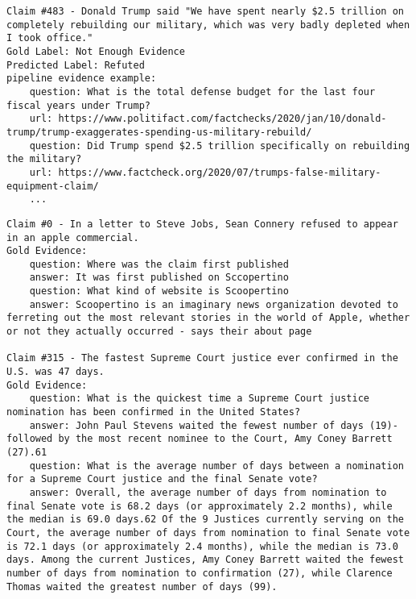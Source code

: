 \begin{lstlisting}[caption={An example of a claim where the evidence consists mainly of evidence from PolitiFact and Factcheck.org fact-checking articles leading to different predicted label than in the gold dataset}, label={lst:polifact_leakage}, breaklines=true, breakatwhitespace=false, columns=fullflexible]
Claim #483 - Donald Trump said "We have spent nearly $2.5 trillion on completely rebuilding our military, which was very badly depleted when I took office."
Gold Label: Not Enough Evidence
Predicted Label: Refuted
pipeline evidence example: 
    question: What is the total defense budget for the last four fiscal years under Trump?
    url: https://www.politifact.com/factchecks/2020/jan/10/donald-trump/trump-exaggerates-spending-us-military-rebuild/
    question: Did Trump spend $2.5 trillion specifically on rebuilding the military?
    url: https://www.factcheck.org/2020/07/trumps-false-military-equipment-claim/
    ...
\end{lstlisting}
\pagebreak
\begin{lstlisting}[caption={An example of a claims which differs in length.}, label={lst:different_lengths}, breaklines=true, breakatwhitespace=false, columns=fullflexible]
Claim #0 - In a letter to Steve Jobs, Sean Connery refused to appear in an apple commercial.
Gold Evidence:
    question: Where was the claim first published
    answer: It was first published on Sccopertino
    question: What kind of website is Scoopertino
    answer: Scoopertino is an imaginary news organization devoted to ferreting out the most relevant stories in the world of Apple, whether or not they actually occurred - says their about page

Claim #315 - The fastest Supreme Court justice ever confirmed in the U.S. was 47 days.
Gold Evidence:
    question: What is the quickest time a Supreme Court justice nomination has been confirmed in the United States?
    answer: John Paul Stevens waited the fewest number of days (19)-followed by the most recent nominee to the Court, Amy Coney Barrett (27).61
    question: What is the average number of days between a nomination for a Supreme Court justice and the final Senate vote?
    answer: Overall, the average number of days from nomination to final Senate vote is 68.2 days (or approximately 2.2 months), while the median is 69.0 days.62 Of the 9 Justices currently serving on the Court, the average number of days from nomination to final Senate vote is 72.1 days (or approximately 2.4 months), while the median is 73.0 days. Among the current Justices, Amy Coney Barrett waited the fewest number of days from nomination to confirmation (27), while Clarence Thomas waited the greatest number of days (99).
\end{lstlisting}